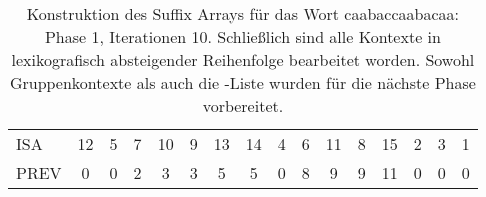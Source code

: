 \begin{table}[H]
\begin{adjustbox}{max width=\textwidth}
\begin{tabular}{lccccccccccccccc}
\multicolumn{1}{l|}{ISA}     & 12                        & 5  & 7                       & 10                         & 9                           & 13                        & 14                         & 4                       & 6                        & 11 & 8                       & 15 & 2  & 3  & 1                         \\
\multicolumn{1}{l|}{PREV}    & 0                         & 0  & 2                       & 3                          & 3                           & 5                         & 5                          & 0                       & 8                        & 9  & 9                       & 11 & 0  & 0  & \cellcolor[HTML]{\red}0
\end{tabular}
\end{adjustbox}

\caption[Konstruktion des Suffix Arrays f{\"u}r das Wort caabaccaabacaa: Phase 1, Iterationen 10]{Konstruktion des Suffix Arrays f{\"u}r das Wort caabaccaabacaa: Phase 1, Iterationen 10. Schlie{\ss}lich sind alle Kontexte in lexikografisch absteigender Reihenfolge bearbeitet worden. Sowohl Gruppenkontexte als auch die \prevpointer-Liste wurden f{\"u}r die n{\"a}chste Phase vorbereitet.}
\label{table_complex_example_1_10} 
\end{table}

